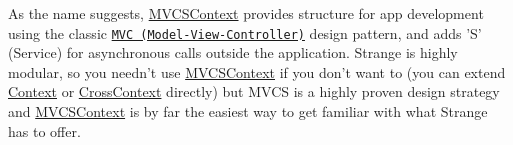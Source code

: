 As the name suggests, \hyperlink{classstrange_1_1extensions_1_1context_1_1impl_1_1_m_v_c_s_context}{M\-V\-C\-S\-Context} provides structure for app development using the classic \href{http://en.wikipedia.org/wiki/Model%E2%80%93view%E2%80%93controller}{\tt M\-V\-C (Model-\/\-View-\/\-Controller)} design pattern, and adds 'S' (Service) for asynchronous calls outside the application. Strange is highly modular, so you needn't use \hyperlink{classstrange_1_1extensions_1_1context_1_1impl_1_1_m_v_c_s_context}{M\-V\-C\-S\-Context} if you don't want to (you can extend \hyperlink{classstrange_1_1extensions_1_1context_1_1impl_1_1_context}{Context} or \hyperlink{classstrange_1_1extensions_1_1context_1_1impl_1_1_cross_context}{Cross\-Context} directly) but M\-V\-C\-S is a highly proven design strategy and \hyperlink{classstrange_1_1extensions_1_1context_1_1impl_1_1_m_v_c_s_context}{M\-V\-C\-S\-Context} is by far the easiest way to get familiar with what Strange has to offer.

